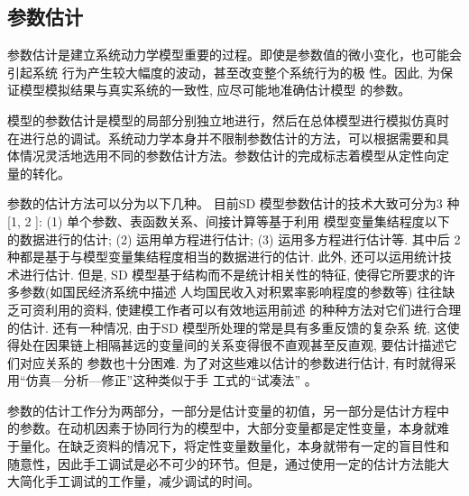 \subsection{参数估计}
参数估计是建立系统动力学模型重要的过程。即使是参数值的微小变化，也可能会引起系统
行为产生较大幅度的波动，甚至改变整个系统行为的极
性。因此, 为保证模型模拟结果与真实系统的一致性, 应尽可能地准确估计模型
的参数。

模型的参数估计是模型的局部分别独立地进行，然后在总体模型进行模拟仿真时
在进行总的调试。系统动力学本身并不限制参数估计的方法，可以根据需要和具
体情况灵活地选用不同的参数估计方法。参数估计的完成标志着模型从定性向定
量的转化。

参数的估计方法可以分为以下几种。
目前SD 模型参数估计的技术大致可分为3 种[1, 2 ]: (1) 单个参数、表函数关系、间接计算等基于利用
模型变量集结程度以下的数据进行的估计; (2) 运用单方程进行估计; (3) 运用多方程进行估计等. 其中后
2 种都是基于与模型变量集结程度相当的数据进行的估计. 此外, 还可以运用统计技术进行估计.
但是, SD 模型基于结构而不是统计相关性的特征, 使得它所要求的许多参数(如国民经济系统中描述
人均国民收入对积累率影响程度的参数等) 往往缺乏可资利用的资料, 使建模工作者可以有效地运用前述
的种种方法对它们进行合理的估计. 还有一种情况, 由于SD 模型所处理的常是具有多重反馈的复杂系
统, 这使得处在因果链上相隔甚远的变量间的关系变得很不直观甚至反直观, 要估计描述它们对应关系的
参数也十分困难. 为了对这些难以估计的参数进行估计, 有时就得采用“仿真—分析—修正”这种类似于手
工式的“试凑法'' \cite{linwenhao2002}。

参数的估计工作分为两部分，一部分是估计变量的初值，另一部分是估计方程中
的参数。在动机因素于协同行为的模型中，大部分变量都是定性变量，本身就难
于量化。在缺乏资料的情况下，将定性变量数量化，本身就带有一定的盲目性和
随意性，因此手工调试是必不可少的环节。但是，通过使用一定的估计方法能大
大简化手工调试的工作量，减少调试的时间。


